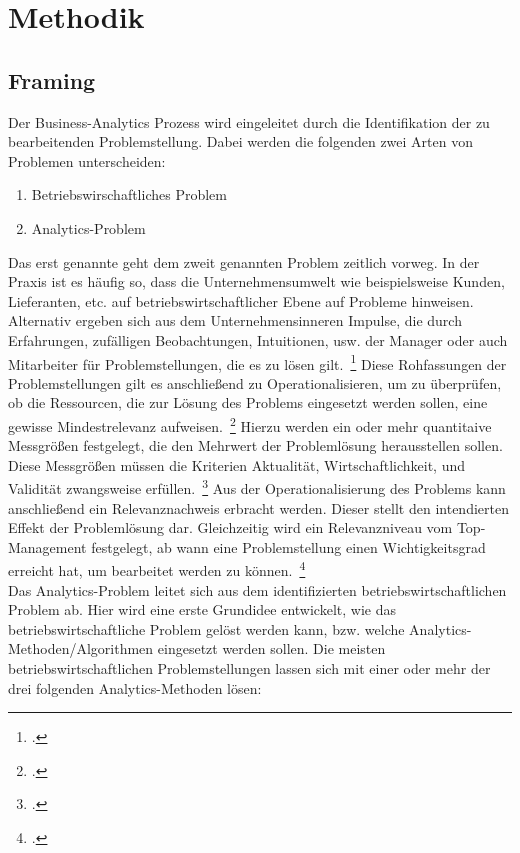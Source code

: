 \newpage
\section{Methodik} \label{sec: Methodik}

\subsection{Framing} \label{sec: t_Framing}

Der Business-Analytics Prozess wird eingeleitet durch die Identifikation der zu bearbeitenden Problemstellung.
Dabei werden die folgenden zwei Arten von Problemen unterscheiden:

\begin{enumerate}
    \item Betriebswirschaftliches Problem
    \item Analytics-Problem
\end{enumerate}

Das erst genannte geht dem zweit genannten Problem zeitlich vorweg.
In der Praxis ist es häufig so, dass die Unternehmensumwelt wie beispielsweise Kunden, Lieferanten, etc. auf
betriebswirtschaftlicher Ebene auf Probleme hinweisen.
Alternativ ergeben sich aus dem Unternehmensinneren Impulse, die durch Erfahrungen, zufälligen Beobachtungen, Intuitionen,
usw. der Manager oder auch Mitarbeiter für Problemstellungen, die es zu lösen gilt.~\footcite[\vglf][]{seiter.2019}
Diese Rohfassungen der Problemstellungen gilt es anschließend zu Operationalisieren, um zu überprüfen, ob die Ressourcen,
die zur Lösung des Problems eingesetzt werden sollen, eine gewisse Mindestrelevanz aufweisen.~\footcite[\vglf][]{seiter.2019}
Hierzu werden ein oder mehr quantitaive Messgrößen festgelegt, die den Mehrwert der Problemlösung herausstellen sollen.
Diese Messgrößen müssen die Kriterien Aktualität, Wirtschaftlichkeit, und Validität zwangsweise erfüllen.~\footcite[\vglf][]{seiter.2019}
Aus der Operationalisierung des Problems kann anschließend ein Relevanznachweis erbracht werden.
Dieser stellt den intendierten Effekt der Problemlösung dar.
Gleichzeitig wird ein Relevanzniveau vom Top-Management festgelegt, ab wann eine Problemstellung einen Wichtigkeitsgrad
erreicht hat, um bearbeitet werden zu können.~\footcite[\vglf][]{seiter.2019}
\\
Das Analytics-Problem leitet sich aus dem identifizierten betriebswirtschaftlichen Problem ab.
Hier wird eine erste Grundidee entwickelt, wie das betriebswirtschaftliche Problem gelöst werden kann, bzw.
welche Analytics-Methoden/Algorithmen eingesetzt werden sollen.
Die meisten betriebswirtschaftlichen Problemstellungen lassen sich mit einer oder mehr der drei folgenden
Analytics-Methoden lösen:

